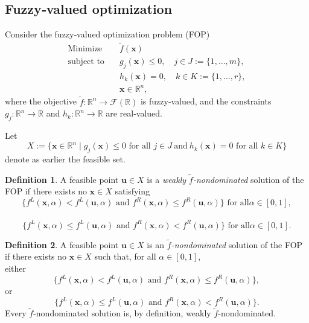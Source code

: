 \documentclass{article}
\theoremstyle{definition}
\newtheorem{maar}{Definition}[section]
\begin{document}
\subsection{Fuzzy‑valued optimization}\label{subFO}
Consider the fuzzy‑valued optimization problem (FOP)
\[
\begin{aligned}
  \text{Minimize} \quad & \widetilde f(\boldsymbol x)\\
  \text{subject to} \quad & g_{j}(\boldsymbol x)\le 0,\quad j\in J:=\{1,\dots,m\},\\
  \quad & h_{k}(\boldsymbol x)=0,\quad k\in K:=\{1,\dots,r\},\\
  & \boldsymbol x\in\mathbb R^{n},
\end{aligned}
\]
where the objective $\widetilde f:\mathbb R^{n}\to\mathcal F(\mathbb R)$ is
fuzzy‑valued, and the constraints
$g_{j}:\mathbb R^{n}\to\mathbb R$ and $h_{k}:\mathbb R^{n}\to\mathbb R$ are real‑valued.  

Let
\[
  X:=\bigl\{\boldsymbol x\in\mathbb R^{n}\mid g_{j}(\boldsymbol x)\le 0
      \text{ for all }j\in J\ \text{and}\ h_{k}(\boldsymbol x)=0
      \text{ for all }k\in K\bigr\}
\]
denote as earlier the feasible set.


\begin{maar}
A feasible point $\boldsymbol u\in X$ is a \emph{weakly \(\tilde f\)-nondominated}
solution of the FOP if there exists no $\boldsymbol x\in X$ satisfying
$$
  \bigl\{f^{L}(\boldsymbol x,\alpha)<f^{L}(\boldsymbol u,\alpha)\text{ and }
        f^{R}(\boldsymbol x,\alpha)\le f^{R}(\boldsymbol u,\alpha)\bigr\} \text{ for all
$\alpha\in[0,1],$}$$
  \;\;\\[2pt]
  $$
  \bigl\{f^{L}(\boldsymbol x,\alpha)\le f^{L}(\boldsymbol u,\alpha)\text{ and }
        f^{R}(\boldsymbol x,\alpha)<f^{R}(\boldsymbol u,\alpha)\bigr\}\text{ for all
$\alpha\in[0,1]$}.$$
\end{maar}
\begin{maar}
A feasible point $\boldsymbol u\in X$ is an \emph{\(\tilde f\)-nondominated} solution
of the FOP if there exists no $\boldsymbol x\in X$ such that, for all $\alpha\in[0,1]$,\\
either
\[
  \bigl\{f^{L}(\boldsymbol x,\alpha)<f^{L}(\boldsymbol u,\alpha)\text{ and }
        f^{R}(\boldsymbol x,\alpha)\le f^{R}(\boldsymbol u,\alpha)\bigr\},
\]        
  or
  \[
  \bigl\{f^{L}(\boldsymbol x,\alpha)\le f^{L}(\boldsymbol u,\alpha)\text{ and }
        f^{R}(\boldsymbol x,\alpha)<f^{R}(\boldsymbol u,\alpha)\bigr\}.
\]
Every \(\tilde f\)-nondominated solution is, by definition, weakly \(\tilde f\)-nondominated.
\end{maar}
\end{document}
